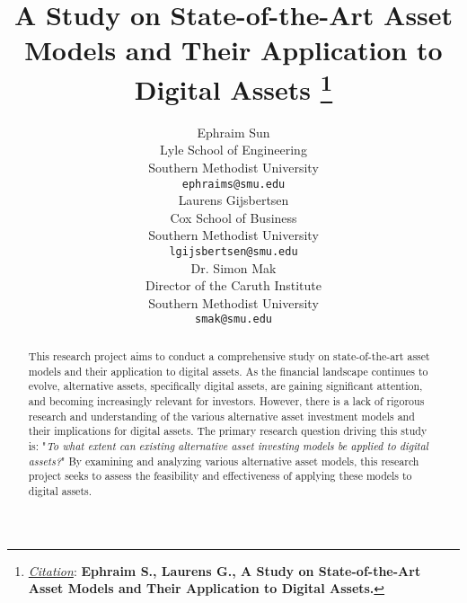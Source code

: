 \documentclass[12pt]{article}
\title{A Study on State-of-the-Art Asset Models and Their Application to Digital Assets
\thanks{\textit{\underline{Citation}}: 
\textbf{Ephraim S., Laurens G., A Study on State-of-the-Art Asset Models and Their Application to Digital Assets. }} %
}
\author{
  Ephraim Sun \\
  Lyle School of Engineering \\
  Southern Methodist University \\
  \texttt{ephraims@smu.edu} \\
   \And
  Laurens Gijsbertsen \\
  Cox School of Business \\
  Southern Methodist University \\
  \texttt{lgijsbertsen@smu.edu} \\
    \And
  Dr. Simon Mak \\
  Director of the Caruth Institute \\
  Southern Methodist University \\
  \texttt{smak@smu.edu} \\
}
\begin{document}
\maketitle

\begin{abstract}
This research project aims to conduct a comprehensive study on state-of-the-art asset models and their application to digital assets. As the financial landscape continues to evolve, alternative assets, specifically digital assets, are gaining significant attention, and becoming increasingly relevant for investors. However, there is a lack of rigorous research and understanding of the various alternative asset investment models and their implications for digital assets. The primary research question driving this study is: "\textit{To what extent can existing alternative asset investing models be applied to digital assets?}" By examining and analyzing various alternative asset models, this research project seeks to assess the feasibility and effectiveness of applying these models to digital assets.
\end{abstract}
















\newpage




\end{document}
